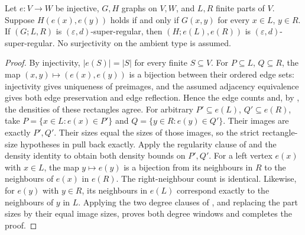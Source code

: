 \begin{lemma}
Let $e:V\to W$ be injective, $G,H$ graphs on $V,W$, and $L,R$ finite
parts of $V$. Suppose $H(e(x),e(y))$ holds if and only if $G(x,y)$
for every $x\in L$, $y\in R$. If $(G;L,R)$ is
$(\varepsilon,d)$-super-regular, then $(H;e(L),e(R))$ is
$(\varepsilon,d)$-super-regular. No surjectivity on the ambient type
is assumed.
\end{lemma}
\begin{proof}
By injectivity, $|e(S)|=|S|$ for every finite $S\subseteq V$.
For $P\subseteq L$, $Q\subseteq R$, the map $(x,y)\mapsto(e(x),e(y))$
is a bijection between their ordered edge sets: injectivity gives
uniqueness of preimages, and the assumed adjacency equivalence gives
both edge preservation and edge reflection. Hence the edge counts
and, by , the densities of these rectangles agree.
For arbitrary $P'\subseteq e(L)$, $Q'\subseteq e(R)$, take
$P=\{x\in L:e(x)\in P'\}$ and $Q=\{y\in R:e(y)\in Q'\}$.
Their images are exactly $P',Q'$. Their sizes equal the sizes of those
images, so the strict rectangle-size hypotheses in
 pull back exactly. Apply the regularity clause
of  and the density identity to obtain both
density bounds on $P',Q'$.
For a left vertex $e(x)$ with $x\in L$, the map $y\mapsto e(y)$ is
a bijection from its neighbours in $R$ to the neighbours of $e(x)$
in $e(R)$. The right-neighbour count is identical. Likewise, for
$e(y)$ with $y\in R$, its neighbours in $e(L)$ correspond exactly
to the neighbours of $y$ in $L$. Applying the two degree clauses of
, and replacing the part sizes by their equal
image sizes, proves both degree windows and completes the proof.
\end{proof}
